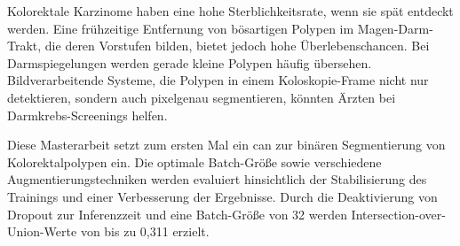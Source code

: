 Kolorektale Karzinome haben eine hohe Sterblichkeitsrate, wenn sie spät entdeckt werden.
Eine frühzeitige Entfernung von bösartigen Polypen im Magen-Darm-Trakt, die deren Vorstufen bilden, bietet jedoch hohe Überlebenschancen.
Bei Darmspiegelungen werden gerade kleine Polypen häufig übersehen.
Bildverarbeitende Systeme, die Polypen in einem Koloskopie-Frame nicht nur detektieren, sondern auch pixelgenau segmentieren, könnten Ärzten bei Darmkrebs-Screenings helfen.

Diese Masterarbeit setzt zum ersten Mal ein \acrlong{can} zur binären Segmentierung von Kolorektalpolypen ein.
Die optimale Batch-Größe sowie verschiedene Augmentierungstechniken werden evaluiert hinsichtlich der Stabilisierung des Trainings und einer Verbesserung der Ergebnisse.
Durch die Deaktivierung von Dropout zur Inferenzzeit und eine Batch-Größe von 32 werden Intersection-over-Union-Werte von bis zu 0,311 erzielt.
